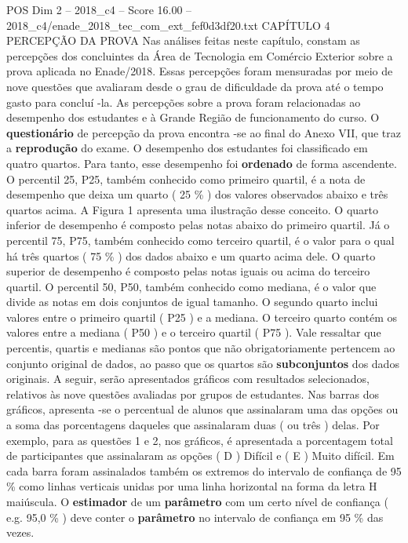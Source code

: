 \begin{textsample}{POS Dim 2 – 2018\_c4 – Score 16.00 – 2018\_c4/enade\_2018\_tec\_com\_ext\_fef0d3df20.txt}  \label{ex:f2_pos_054}
CAPÍTULO 4 PERCEPÇÃO DA PROVA Nas análises feitas neste capítulo, constam as percepções dos concluintes da Área de Tecnologia em Comércio Exterior sobre a prova aplicada no Enade/2018.
Essas percepções foram mensuradas por meio de nove questões que avaliaram desde o grau de dificuldade da prova até o tempo gasto para concluí -la.
As percepções sobre a prova foram relacionadas ao desempenho dos estudantes e à Grande Região de funcionamento do curso.
O \textbf{questionário} de percepção da prova encontra -se ao final do Anexo VII, que traz a \textbf{reprodução} do exame.
O desempenho dos estudantes foi classificado em quatro quartos.
Para tanto, esse desempenho foi \textbf{ordenado} de forma ascendente.
O percentil 25, P25, também conhecido como primeiro quartil, é a nota de desempenho que deixa um quarto ( 25 \% ) dos valores observados abaixo e três quartos acima.
A Figura 1 apresenta uma ilustração desse conceito.
O quarto inferior de desempenho é composto pelas notas abaixo do primeiro quartil.
Já o percentil 75, P75, também conhecido como terceiro quartil, é o valor para o qual há três quartos ( 75 \% ) dos dados abaixo e um quarto acima dele.
O quarto superior de desempenho é composto pelas notas iguais ou acima do terceiro quartil.
O percentil 50, P50, também conhecido como mediana, é o valor que divide as notas em dois conjuntos de igual tamanho.
O segundo quarto inclui valores entre o primeiro quartil ( P25 ) e a mediana.
O terceiro quarto contém os valores entre a mediana ( P50 ) e o terceiro quartil ( P75 ).
Vale ressaltar que percentis, quartis e medianas são pontos que não obrigatoriamente pertencem ao conjunto original de dados, ao passo que os quartos são \textbf{subconjuntos} dos dados originais.
A seguir, serão apresentados gráficos com resultados selecionados, relativos às nove questões avaliadas por grupos de estudantes.
Nas barras dos gráficos, apresenta -se o percentual de alunos que assinalaram uma das opções ou a soma das porcentagens daqueles que assinalaram duas ( ou três ) delas.
Por exemplo, para as questões 1 e 2, nos gráficos, é apresentada a porcentagem total de participantes que assinalaram as opções ( D ) Difícil e ( E ) Muito difícil.
Em cada barra foram assinalados também os extremos do intervalo de confiança de 95 \% como linhas verticais unidas por uma linha horizontal na forma da letra H maiúscula.
O \textbf{estimador} de um \textbf{parâmetro} com um certo nível de confiança ( e.g. 95,0 \% ) deve conter o \textbf{parâmetro} no intervalo de confiança em 95 \% das vezes.

\end{textsample}
